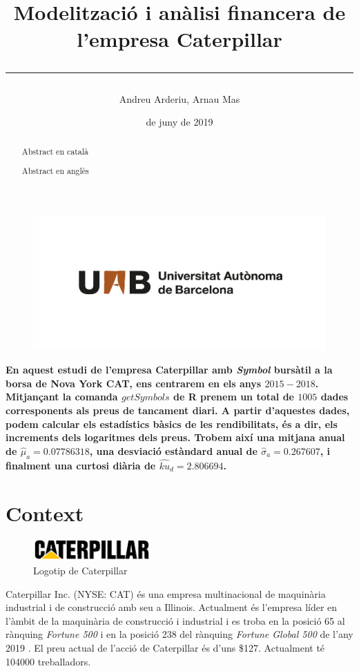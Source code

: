\documentclass{article}
\title{\sffamily \bfseries Modelització i anàlisi financera de l'empresa Caterpillar \vspace{1em} \hrule}
\author{\sffamily Andreu Arderiu, Arnau Mas}
\date{\sffamily 14 de juny de 2019}
\numberwithin{table}{section}
\numberwithin{figure}{section}
\numberwithin{equation}{section}
\begin{document}
\begin{titlepage}
	\clearpage
	\thispagestyle{empty}
	\maketitle	

	\renewcommand{\abstractname}{\bfseries \sffamily Resum:}
	\begin{abstract}
		Abstract en català
	\end{abstract}

	\renewcommand{\abstractname}{\bfseries \sffamily Abstract:}
	\begin{abstract}
		Abstract en anglès
	\end{abstract}

	\begin{figure}[b]
		\thispagestyle{empty}
		\center \includegraphics[scale = 0.3]{uab}
	\end{figure}
\end{titlepage}

\textbf{En aquest estudi de l'empresa Caterpillar amb \textit{Symbol} bursàtil a la borsa de Nova York CAT, ens centrarem en els anys $2015-2018$. Mitjançant la comanda $getSymbols$ de R prenem un total de $1005$ dades corresponents als preus de tancament diari. A partir d'aquestes dades, podem calcular els estadístics bàsics de les rendibilitats, és a dir, els increments dels logaritmes dels preus. Trobem així una mitjana anual de $\hat{\mu}_a=0.07786318$, una desviació estàndard anual de $\hat{\sigma}_a=0.267607$, i finalment una curtosi diària de $\hat{ku}_d=2.806694$. }
\section{Context}
\begin{figure}[htb]
	\centering \small \sffamily
	\includegraphics[width=0.4\textwidth]{cat-logo}
	\caption{Logotip de Caterpillar}
	\label{fig:logo}
\end{figure}
Caterpillar Inc. (NYSE: CAT) és una empresa multinacional de maquinària industrial i de construcció amb seu a Illinois. Actualment és l'empresa líder en l'àmbit de la maquinària de construcció i industrial \cite{cat} i es troba en la posició 65 al rànquing \emph{Fortune 500} i en la posició 238 del rànquing \emph{Fortune Global 500} de l'any 2019 \cite{fortune,global}. El preu actual de l'acció de Caterpillar és d'uns \$127. Actualment té \num{104000} treballadors. 
\end{document}

